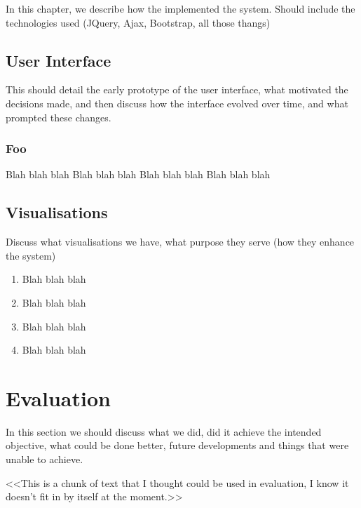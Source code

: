 \documentclass[a4paper]{l3proj}
\begin{document}
In this chapter, we describe how the implemented the system.  Should include the technologies used 
(JQuery, Ajax, Bootstrap, all those thangs)

\section{User Interface}

This should detail the early prototype of the user interface, what motivated the decisions made, 
and then discuss how the interface evolved over time, and what prompted these changes.

\subsection{Foo}

Blah blah blah
Blah blah blah
Blah blah blah
Blah blah blah

\section{Visualisations}

Discuss what visualisations we have, what purpose they serve (how they enhance the system)	
	
\begin{enumerate}
\item Blah blah blah
\item Blah blah blah
\item Blah blah blah
\item Blah blah blah
\end{enumerate}



\chapter{Evaluation}

In this section we should discuss what we did, did it achieve the intended objective, what could be done better, 
future developments and things that were unable to achieve.

<<This is a chunk of text that I thought could be used in evaluation, I know it doesn't fit in by itself at the moment.>>
\end{document}
